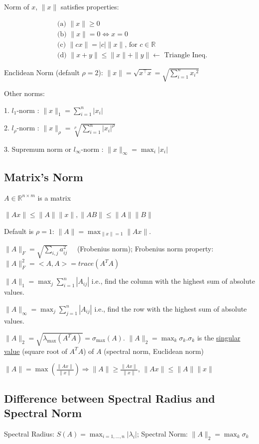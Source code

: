 \documentclass[11pt]{elegantbook}
\begin{document}
Norm of $x$, $\|x\|$ satisfies properties:

$$
\begin{aligned}
&\text { (a) }\|x\| \geqslant 0 \\
&\text { (b) }\|x\|=0 \Leftrightarrow x=0 \\
&\text { (c) }\|c x\|=|c|\|x\| \text {, for } c \in \mathbb{R} \\
&\text { (d) }\|x+y\| \leqslant\|x\|+\|y\| \longleftarrow \text { Triangle Ineq. }
\end{aligned}
$$

Enclidean Norm (default $\rho=2$): $\|x\|=\sqrt{x^{\top} x}=\sqrt{\sum_{i=1}^{n} x_{i}{ }^{2}}$

Other norms:

1. $l_{1}$-norm : $\|x\|_{1}=\sum_{i=1}^{n}\left|x_{i}\right|$

2. $l_{\rho}$-norm : $\|x\|_{\rho}=\sqrt[\rho]{\sum_{i=1}^{n}\left|x_{i}\right|^\rho}$

3. Supremum norm or $l_{\infty}$-norm : $\|x\|_{\infty}=\max _{i}\left|x_{i}\right|$

\subsection{Matrix's Norm}
$A\in \mathbb{R}^{n\times m}$ is a matrix

$\|A x\| \leqslant\|A\|\|x\|,\|A B\| \leqslant\|A\|\|B\|$

Default is $\rho=1$: $\|A\|=\max _{\|x\|=1}\|A x\|$.

$\|A\|_{F}=\sqrt{\sum_{i, j} a_{i j}^{2}} \quad$ (Frobenius norm);  Frobenius norm property: $\|A\|_F^2=<A,A>=trace(A^TA)$

$\|A\|_{1}=\max _{j} \sum_{i=1}^{n}\left|A_{i j}\right|$ i.e., find the column with the highest sum of absolute values.

$\|A\|_{\infty}=\max _{j} \sum_{j=1}^{n}\left|A_{i j}\right|$ i.e., find the row with the highest sum of absolute values.

${\displaystyle \|A\|_{2}={\sqrt {\lambda _{\max }\left(A^{T}A\right)}}=\sigma _{\max }(A).}$
$\|A\|_{2}=\max _{k} \sigma_{k}. \sigma_{k}$ is the \underline{singular value} (square root of $A^TA$) of $A$ (spectral norm, Euclidean norm)

$\|A\|=\max \left(\frac{\|A x\|}{\|x\|}\right) \Rightarrow\|A\| \geqslant \frac{\|A x\|}{\|x\|}$, $\|Ax\| \leqslant\|A\|\|x\|$

\subsection{Difference between Spectral Radius and Spectral Norm}
Spectral Radius: $S(A)=\max_{i=1,...,n}|\lambda_i|$; Spectral Norm: $\|A\|_{2}=\max _{k} \sigma_{k}$
\end{document}
